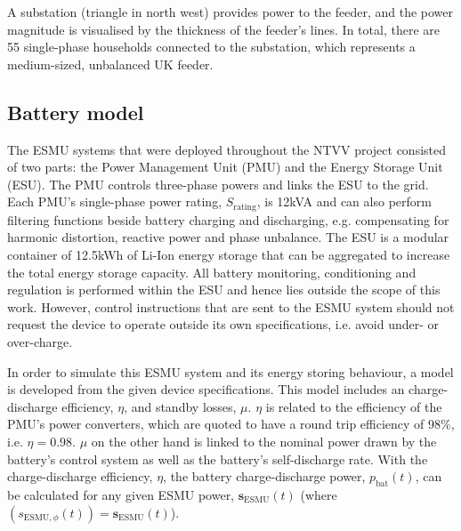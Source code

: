 

A substation (triangle in north west) provides power to the feeder, and the power magnitude is visualised by the thickness of the feeder's lines.
In total, there are 55 single-phase households connected to the substation, which represents a medium-sized, unbalanced UK feeder.

\subsection{Battery model}


The ESMU systems that were deployed throughout the NTVV project consisted of two parts: the Power Management Unit (PMU) and the Energy Storage Unit (ESU).
The PMU controls three-phase powers and links the ESU to the grid.
Each PMU's single-phase power rating, $S_\text{rating}$, is 12kVA and can also perform filtering functions beside battery charging and discharging, e.g. compensating for harmonic distortion, reactive power and phase unbalance.
The ESU is a modular container of 12.5kWh of Li-Ion energy storage that can be aggregated to increase the total energy storage capacity.
All battery monitoring, conditioning and regulation is performed within the ESU and hence lies outside the scope of this work.
However, control instructions that are sent to the ESMU system should not request the device to operate outside its own specifications, i.e. avoid under- or over-charge.

\nomenclature[I]{$\eta$}{Round-trip efficiency of power electronics, where $\eta \in (0, 1]$ (Chapter \ref{ch1})}

In order to simulate this ESMU system and its energy storing behaviour, a model is developed from the given device specifications.
This model includes an charge-discharge efficiency, $\eta$, and standby losses, $\mu$.
$\eta$ is related to the efficiency of the PMU's power converters, which are quoted to have a round trip efficiency of 98\%, i.e. $\eta = 0.98$.
$\mu$ on the other hand is linked to the nominal power drawn by the battery's control system as well as the battery's self-discharge rate.
With the charge-discharge efficiency, $\eta$, the battery charge-discharge power, $p_\text{bat}(t)$, can be calculated for any given ESMU power, $\textbf{s}_\text{ESMU}(t)$ (where $(s_{\text{ESMU},\phi}(t)) = \textbf{s}_\text{ESMU}(t)$).

